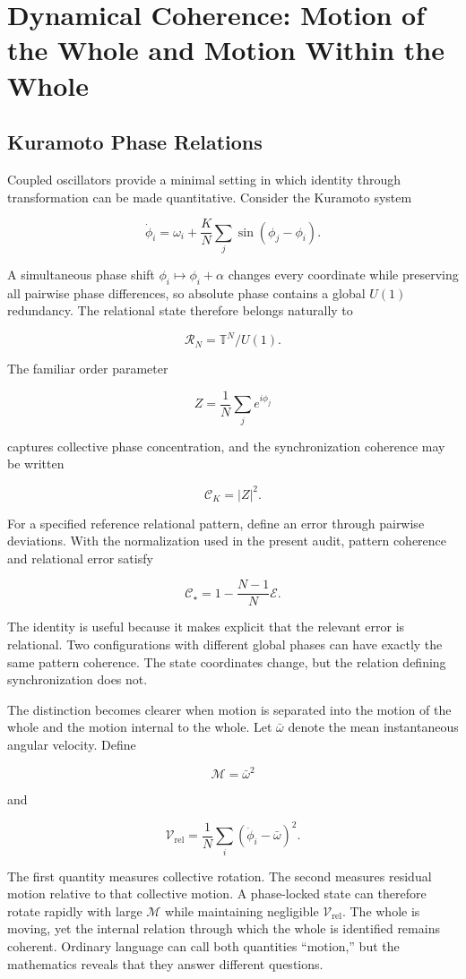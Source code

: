 \chapter{Dynamical Coherence: Motion of the Whole and Motion Within the Whole}

\section{Kuramoto Phase Relations}

Coupled oscillators provide a minimal setting in which identity through transformation can be made quantitative. Consider the Kuramoto system

\[
\dot\phi_i=\omega_i+\frac{K}{N}\sum_j\sin(\phi_j-\phi_i).
\]

A simultaneous phase shift $\phi_i\mapsto\phi_i+\alpha$ changes every coordinate while preserving all pairwise phase differences, so absolute phase contains a global $U(1)$ redundancy. The relational state therefore belongs naturally to

\[
\mathcal R_N=\mathbb T^N/U(1).
\]

The familiar order parameter

\[
Z=\frac1N\sum_j e^{i\phi_j}
\]

captures collective phase concentration, and the synchronization coherence may be written

\[
\mathscr C_K=|Z|^2.
\]

For a specified reference relational pattern, define an error through pairwise deviations. With the normalization used in the present audit, pattern coherence and relational error satisfy

\[
\mathscr C_\star=1-\frac{N-1}{N}\mathcal E.
\]

The identity is useful because it makes explicit that the relevant error is relational. Two configurations with different global phases can have exactly the same pattern coherence. The state coordinates change, but the relation defining synchronization does not.

The distinction becomes clearer when motion is separated into the motion of the whole and the motion internal to the whole. Let $\bar\omega$ denote the mean instantaneous angular velocity. Define

\[
\mathcal M=\bar\omega^2
\]

and

\[
\mathscr V_{\mathrm{rel}}=\frac1N\sum_i(\dot\phi_i-\bar\omega)^2.
\]

The first quantity measures collective rotation. The second measures residual motion relative to that collective motion. A phase-locked state can therefore rotate rapidly with large $\mathcal M$ while maintaining negligible $\mathscr V_{\mathrm{rel}}$. The whole is moving, yet the internal relation through which the whole is identified remains coherent. Ordinary language can call both quantities ``motion,'' but the mathematics reveals that they answer different questions.

